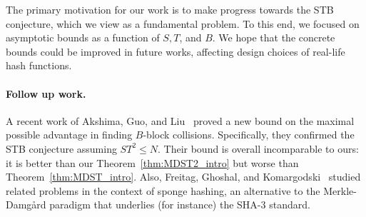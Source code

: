 The primary motivation for our work is to make progress towards the STB conjecture, which we view as a fundamental problem. To this end, we focused on asymptotic bounds as a function of $S, T$, and $B$. We hope that the concrete bounds could be improved in future works, affecting design choices of real-life hash functions.

\paragraph{Follow up work.}
A recent work of Akshima, Guo, and Liu~\cite{AkshimaGL22} proved a new bound on the maximal possible advantage in finding $B$-block collisions. Specifically, they confirmed the STB conjecture assuming $ST^2 \leq N$. Their bound is overall incomparable to ours: it is better than our Theorem~\ref{thm:MDST2_intro} but worse than Theorem~\ref{thm:MDST_intro}.
Also, Freitag, Ghoshal, and Komargodski~\cite{FreitagGK22} studied related problems in the context of sponge hashing, an alternative to the Merkle-Damg{\aa}rd paradigm that underlies  (for instance) the SHA-3 standard.


